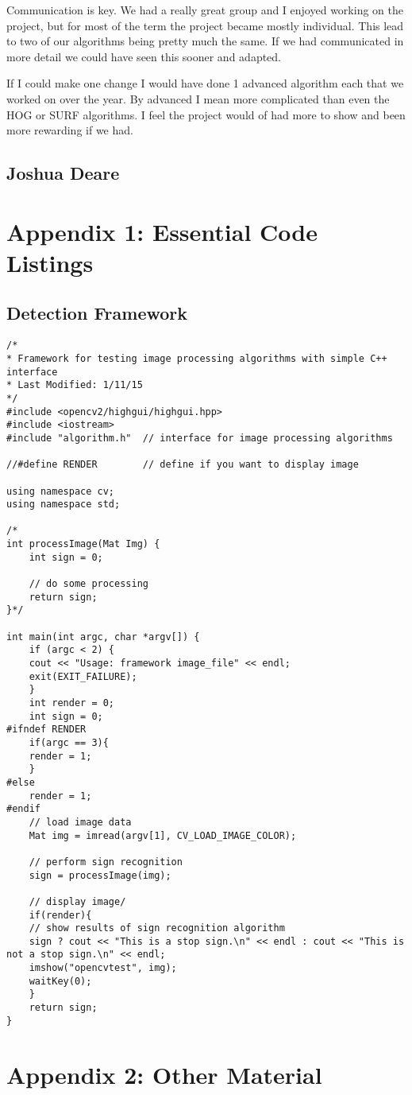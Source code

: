 \documentclass[letterpaper,10pt,titlepage]{article}
\begin{document}
Communication is key. We had a really great group and I enjoyed working on the
project, but for most of the term the project became mostly individual. This lead
to two of our algorithms being pretty much the same. If we had communicated in 
more detail we could have seen this sooner and adapted.


If I could make one change I would have done 1 advanced algorithm each that we worked on over the year.
By advanced I mean more complicated than even the HOG or SURF algorithms. I feel
the project would of had more to show and been more rewarding if we had.

\subsection*{Joshua Deare}

\section*{Appendix 1: Essential Code Listings}
\subsection*{Detection Framework}
\begin{lstlisting}
/*
* Framework for testing image processing algorithms with simple C++ interface
* Last Modified: 1/11/15
*/
#include <opencv2/highgui/highgui.hpp>
#include <iostream>
#include "algorithm.h"	// interface for image processing algorithms

//#define RENDER		// define if you want to display image

using namespace cv;
using namespace std;

/*
int processImage(Mat Img) {
	int sign = 0;

	// do some processing
	return sign;
}*/

int main(int argc, char *argv[]) {
    if (argc < 2) {
	cout << "Usage: framework image_file" << endl;
	exit(EXIT_FAILURE);
    }
    int render = 0;
    int sign = 0;
#ifndef RENDER
    if(argc == 3){
	render = 1;
    }
#else
    render = 1;
#endif
    // load image data  
    Mat img = imread(argv[1], CV_LOAD_IMAGE_COLOR);

    // perform sign recognition
    sign = processImage(img);
    
    // display image/
    if(render){
	// show results of sign recognition algorithm
	sign ? cout << "This is a stop sign.\n" << endl : cout << "This is not a stop sign.\n" << endl;
	imshow("opencvtest", img);
	waitKey(0);
    }
    return sign;
}

\end{lstlisting}
\section*{Appendix 2: Other Material}
\end{document}
